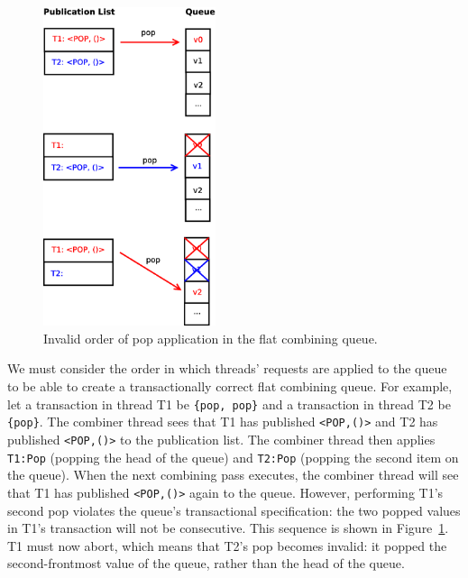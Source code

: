\begin{figure}[t]
\centering
\includegraphics[width=0.45\textwidth]{fcqueue_publist}
\caption{Invalid order of pop application in the flat combining queue.}
\label{fig:fcqueue_publist}
\end{figure}

We must consider the order in which threads' requests are applied to the queue to be able to create a transactionally correct flat combining queue. For example, let a transaction in thread T1 be \texttt{\{pop, pop\}} and a transaction in thread T2 be \texttt{\{pop\}}. The combiner thread sees that T1 has published \texttt{<POP,()>} and T2 has published \texttt{<POP,()>} to the publication list. The combiner thread then applies \texttt{T1:Pop} (popping the head of the queue) and \texttt{T2:Pop} (popping the second item on the queue). When the next combining pass executes, the combiner thread will see that T1 has published \texttt{<POP,()>} again to the queue. However, performing T1's second pop violates the queue's transactional specification: the two popped values in T1's transaction will not be consecutive. This sequence is shown in Figure~\ref{fig:fcqueue_publist}. T1 must now abort, which means that T2's pop becomes invalid: it popped the second-frontmost value of the queue, rather than the head of the queue.

